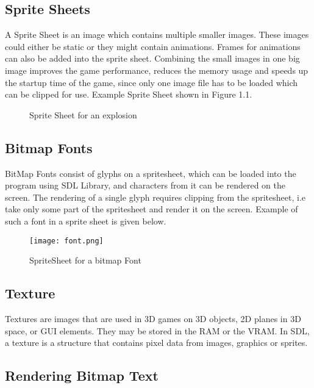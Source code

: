 \documentclass[11pt,fleqn]{book} %
\begin{document}
\subsection{Sprite Sheets}
A Sprite Sheet is an image which contains multiple smaller images. These images could either be static or they might contain animations. Frames for animations can also be added into the sprite sheet. Combining the small images in one big image improves the game performance, reduces the memory usage and speeds up the startup time of the game, since only one image file has to be loaded which can be clipped for use. Example Sprite Sheet shown in Figure 1.1.

\begin{figure}[h]
  \centering
  \caption{Sprite Sheet for an explosion}
\end{figure}


\subsection{Bitmap Fonts}

BitMap Fonts consist of glyphs on a spritesheet, which can be loaded into the program using SDL Library, and characters from it can be rendered on the screen. The rendering of a single glyph requires clipping from the spritesheet, i.e take only some part of the spritesheet and render it on the screen. Example of such a font in a sprite sheet is given below.

\begin{figure}[h]
  \centering
  \texttt{[image: font.png]}
  \caption{SpriteSheet for a bitmap Font}
\end{figure}


\subsection{Texture}

Textures are images that are used in 3D games on 3D objects, 2D planes in 3D space, or GUI elements. They may be stored in the RAM or the VRAM. In SDL, a texture is a structure that contains pixel data from images, graphics or sprites. 

\subsection{Rendering Bitmap Text}
\end{document}
